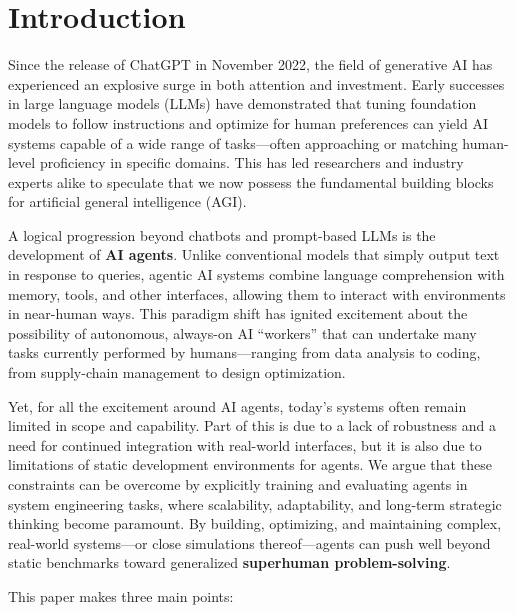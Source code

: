 
\section{Introduction}
Since the release of ChatGPT in November 2022, the field of generative AI has experienced an explosive surge in both attention and investment. Early successes in large language models (LLMs) have demonstrated that tuning foundation models to follow instructions and optimize for human preferences can yield AI systems capable of a wide range of tasks—often approaching or matching human-level proficiency in specific domains. This has led researchers and industry experts alike to speculate that we now possess the fundamental building blocks for artificial general intelligence (AGI).

A logical progression beyond chatbots and prompt-based LLMs is the development of \textbf{AI agents}. Unlike conventional models that simply output text in response to queries, agentic AI systems combine language comprehension with memory, tools, and other interfaces, allowing them to interact with environments in near-human ways. This paradigm shift has ignited excitement about the possibility of autonomous, always-on AI “workers” that can undertake many tasks currently performed by humans—ranging from data analysis to coding, from supply-chain management to design optimization.

Yet, for all the excitement around AI agents, today’s systems often remain limited in scope and capability. Part of this is due to a lack of robustness and a need for continued integration with real-world interfaces, but it is also due to limitations of static development environments for agents. We argue that these constraints can be overcome by explicitly training and evaluating agents in system engineering tasks, where scalability, adaptability, and long-term strategic thinking become paramount. By building, optimizing, and maintaining complex, real-world systems—or close simulations thereof—agents can push well beyond static benchmarks toward generalized \textbf{superhuman problem-solving}.

This paper makes three main points:


